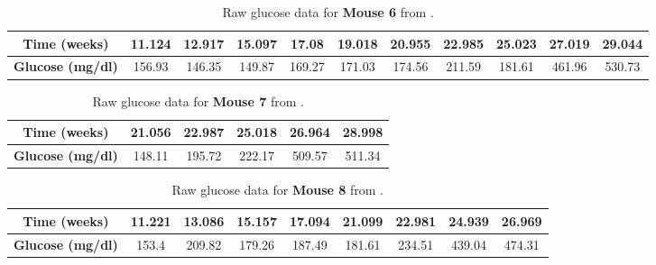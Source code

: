 \begin{appendices}
\begin{table}[H]
\centering
  \begin{center} 
    \begin{tabular} {c|c|c|c|c|c|c|c|c|c|c}%
    \cline{1-11}
      \textbf{Time (weeks)} & 11.124 & 12.917 & 15.097 & 17.08 & 19.018 & 20.955 & 22.985 & 25.023 & 27.019 & 29.044\\
      \hline
      \textbf{Glucose (mg/dl)} & 156.93 & 146.35 & 149.87 & 169.27 & 171.03 & 174.56 & 211.59 & 181.61 & 461.96 & 530.73\\
      \hline
    \end{tabular}
    \caption{Raw glucose data for \textbf{Mouse 6} from \cite{Lietal2009}.}
    \label{table:Li_Mouse6}
  \end{center}
\end{table}

\begin{table}[H]
\centering
  \begin{center} 
    \begin{tabular} {c|c|c|c|c|c}%
    \cline{1-6}
      \textbf{Time (weeks)} & 21.056 & 22.987 & 25.018 & 26.964 & 28.998\\
      \hline
      \textbf{Glucose (mg/dl)} & 148.11& 195.72 & 222.17 & 509.57 & 511.34\\
      \hline
    \end{tabular}
    \caption{Raw glucose data for \textbf{Mouse 7} from \cite{Lietal2009}.}
    \label{table:Li_Mouse7}
  \end{center}
\end{table}

\begin{table}[H]
\centering
  \begin{center} 
    \begin{tabular} {c|c|c|c|c|c|c|c|c}%
    \cline{1-9}
      \textbf{Time (weeks)} & 11.221 & 13.086 & 15.157 & 17.094 & 21.099 & 22.981 & 24.939 & 26.969\\
      \hline
      \textbf{Glucose (mg/dl)} & 153.4 & 209.82 & 179.26 & 187.49 & 181.61 & 234.51 & 439.04 & 474.31\\
      \hline
    \end{tabular}
    \caption{Raw glucose data for \textbf{Mouse 8} from \cite{Lietal2009}.}
    \label{table:Li_Mouse8}
  \end{center}
\end{table}


\end{appendices}
